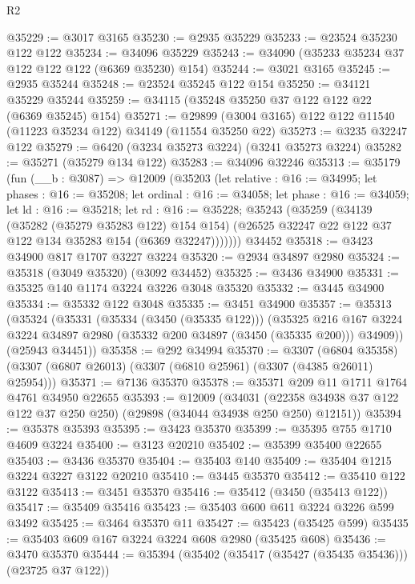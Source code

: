 \begin{lexlean}{R2}
\begin{coremodule}
@35229 := @3017 @3165
@35230 := @2935 @35229
@35233 := @23524 @35230 @122 @122
@35234 := @34096 @35229
@35243 := @34090 (@35233 @35234 @37 @122 @122 @122 (@6369 @35230) @154)
@35244 := @3021 @3165
@35245 := @2935 @35244
@35248 := @23524 @35245 @122 @154
@35250 := @34121 @35229 @35244
@35259 := @34115 (@35248 @35250 @37 @122 @122 @22 (@6369 @35245) @154)
@35271 := @29899 (@3004 @3165) @122 @122 @11540 (@11223 @35234 @122) @34149 (@11554 @35250 @22)
@35273 := @3235 @32247 @122
@35279 := @6420 (@3234 @35273 @3224) (@3241 @35273 @3224)
@35282 := @35271 (@35279 @134 @122)
@35283 := @34096 @32246
@35313 := @35179
    (fun (__b : @3087) =>
    @12009
      (@35203
        (let relative : @16 := @34995;
        let phases : @16 := @35208;
        let ordinal : @16 := @34058;
        let phase : @16 := @34059;
        let ld : @16 := @35218;
        let rd : @16 := @35228;
        @35243
          (@35259
            (@34139
              (@35282 (@35279 @35283 @122) @154 @154)
              (@26525 @32247 @22 @122 @37 @122 @134 @35283 @154 (@6369 @32247)))))))
    @34452
@35318 := @3423 @34900 @817 @1707 @3227 @3224
@35320 := @2934 @34897 @2980
@35324 := @35318 (@3049 @35320) (@3092 @34452)
@35325 := @3436 @34900
@35331 := @35325 @140 @1174 @3224 @3226 @3048 @35320
@35332 := @3445 @34900
@35334 := @35332 @122 @3048
@35335 := @3451 @34900
@35357 := @35313
    (@35324
      (@35331
        (@35334 (@3450 (@35335 @122)))
        (@35325
          @216
          @167
          @3224
          @3224
          @34897
          @2980
          (@35332 @200 @34897 (@3450 (@35335 @200)))
          @34909))
      (@25943 @34451))
@35358 := @292 @34994
@35370 := @3307
    (@6804 @35358)
    (@3307 (@6807 @26013) (@3307 (@6810 @25961) (@3307 (@4385 @26011) @25954)))
@35371 := @7136 @35370
@35378 := @35371 @209 @11 @1711 @1764 @4761 @34950 @22655
@35393 := @12009
    (@34031 (@22358 @34938 @37 @122 @122 @37 @250 @250) (@29898 (@34044 @34938 @250 @250) @12151))
@35394 := @35378 @35393
@35395 := @3423 @35370
@35399 := @35395 @755 @1710 @4609 @3224
@35400 := @3123 @20210
@35402 := @35399 @35400 @22655
@35403 := @3436 @35370
@35404 := @35403 @140
@35409 := @35404 @1215 @3224 @3227 @3122 @20210
@35410 := @3445 @35370
@35412 := @35410 @122 @3122
@35413 := @3451 @35370
@35416 := @35412 (@3450 (@35413 @122))
@35417 := @35409 @35416
@35423 := @35403 @600 @611 @3224 @3226 @599 @3492
@35425 := @3464 @35370 @11
@35427 := @35423 (@35425 @599)
@35435 := @35403 @609 @167 @3224 @3224 @608 @2980 (@35425 @608)
@35436 := @3470 @35370
@35444 := @35394 (@35402 (@35417 (@35427 (@35435 @35436))) (@23725 @37 @122))

\end{coremodule}
\end{lexlean}
